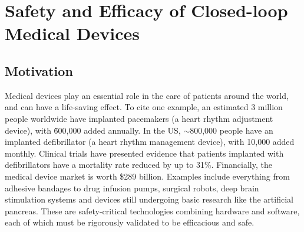  \section{Safety and Efficacy of Closed-loop Medical Devices}
\subsection{Motivation}
Medical devices play an essential role in the care of patients around the world, and can have a life-saving effect.
To cite one example, an estimated 3 million people worldwide have implanted pacemakers (a heart rhythm adjustment device), with \~600,000 added annually.
In the US, $\sim$800,000 people have an implanted defibrillator (a heart rhythm management device), with 10,000 added monthly.
Clinical trials have presented evidence that patients implanted with defibrillators have a mortality rate reduced by up to 31\%.
Financially, the medical device market is worth \$289 billion.
Examples include everything from adhesive bandages to drug infusion pumps, surgical robots, deep brain stimulation systems and devices still undergoing basic research like the artificial pancreas.
These are safety-critical technologies combining hardware and software, each of which must be rigorously validated to be efficacious and safe.

